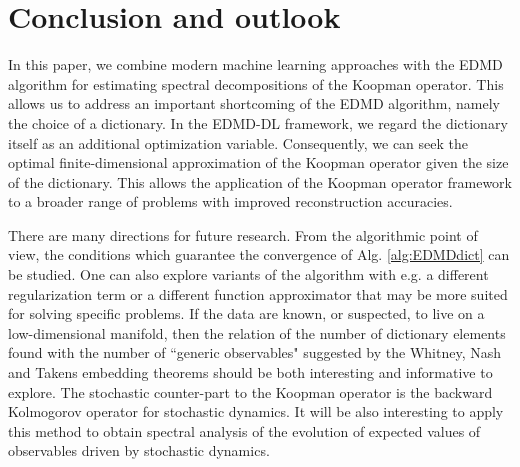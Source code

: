 \documentclass[%
 aip,
 cha,
 sd,%
 amsmath,amssymb,
 preprint,%
]{revtex4-1}
\begin{document}
\section{Conclusion and outlook}\label{sec:conclusion}

In this paper, we combine modern machine learning approaches with the EDMD algorithm for estimating spectral decompositions of the Koopman operator. This allows us to address an important shortcoming of the EDMD algorithm, namely the choice of a dictionary. In the EDMD-DL framework, we regard the dictionary itself as an additional optimization variable. Consequently, we can seek the optimal finite-dimensional approximation of the Koopman operator given the size of the dictionary. This allows the application of the Koopman operator framework to a broader range of problems with improved reconstruction accuracies. 

There are many directions for future research. From the algorithmic point of view, the conditions which guarantee the convergence of Alg. \ref{alg:EDMDdict} can be studied. One can also explore variants of the algorithm with e.g. a different regularization term or a different function approximator that may be more suited for solving specific problems. 
If the data are known, or suspected, to live on a low-dimensional manifold, then the relation of the number of dictionary elements found with the number of ``generic observables" suggested by the Whitney, Nash and Takens embedding theorems \cite{sauer1991embedology} should be both interesting and informative to explore. 
The stochastic counter-part to the Koopman operator is the backward Kolmogorov operator for stochastic dynamics. It will be also interesting to apply this method to obtain spectral analysis of the evolution of expected values of observables driven by stochastic dynamics.

\end{document}
